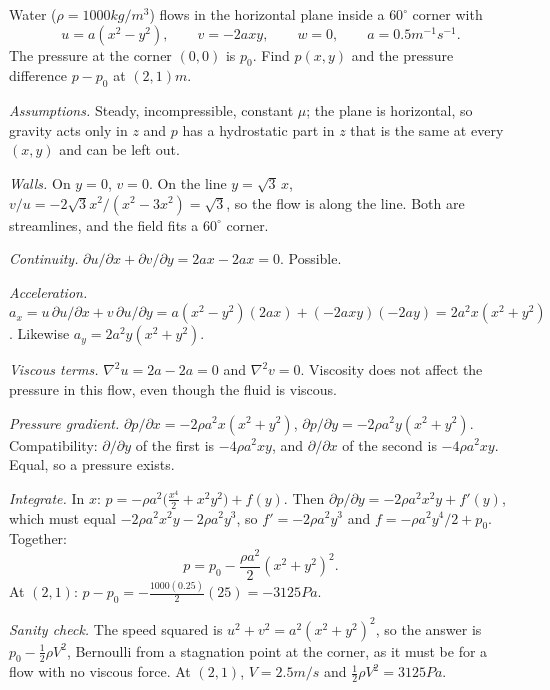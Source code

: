 \begin{example}
Water ($\rho = 1000\unit{kg/m^3}$) flows in the horizontal plane inside a $60^\circ$ corner with
\[
u = a(x^2 - y^2), \qquad v = -2axy, \qquad w = 0, \qquad a = 0.5\unit{m^{-1}s^{-1}} .
\]
The pressure at the corner $(0,0)$ is $p_0$. Find $p(x,y)$ and the pressure difference $p - p_0$ at $(2, 1)\unit{m}$.

\emph{Assumptions.} Steady, incompressible, constant $\mu$; the plane is horizontal, so gravity acts only in $z$ and $p$ has a hydrostatic part in $z$ that is the same at every $(x,y)$ and can be left out.

\emph{Walls.} On $y = 0$, $v = 0$. On the line $y = \sqrt3\,x$, $v/u = -2\sqrt3x^2/(x^2 - 3x^2) = \sqrt3$, so the flow is along the line. Both are streamlines, and the field fits a $60^\circ$ corner.

\emph{Continuity.} $\partial u/\partial x + \partial v/\partial y = 2ax - 2ax = 0$. Possible.

\emph{Acceleration.} $a_x = u\,\partial u/\partial x + v\,\partial u/\partial y = a(x^2 - y^2)(2ax) + (-2axy)(-2ay) = 2a^2x(x^2 + y^2)$. Likewise $a_y = 2a^2y(x^2 + y^2)$.

\emph{Viscous terms.} $\nabla^2 u = 2a - 2a = 0$ and $\nabla^2 v = 0$. Viscosity does not affect the pressure in this flow, even though the fluid is viscous.

\emph{Pressure gradient.} $\partial p/\partial x = -2\rho a^2 x(x^2 + y^2)$, $\partial p/\partial y = -2\rho a^2 y(x^2 + y^2)$. Compatibility: $\partial/\partial y$ of the first is $-4\rho a^2 xy$, and $\partial/\partial x$ of the second is $-4\rho a^2 xy$. Equal, so a pressure exists.

\emph{Integrate.} In $x$: $p = -\rho a^2\big(\tfrac{x^4}{2} + x^2y^2\big) + f(y)$. Then $\partial p/\partial y = -2\rho a^2x^2y + f'(y)$, which must equal $-2\rho a^2 x^2 y - 2\rho a^2 y^3$, so $f' = -2\rho a^2 y^3$ and $f = -\rho a^2 y^4/2 + p_0$. Together:
\[
p = p_0 - \frac{\rho a^2}{2}(x^2 + y^2)^2 .
\]
At $(2,1)$: $p - p_0 = -\tfrac{1000(0.25)}{2}(25) = -3125\unit{Pa}$.

\emph{Sanity check.} The speed squared is $u^2 + v^2 = a^2(x^2 + y^2)^2$, so the answer is $p_0 - \tfrac12\rho V^2$, Bernoulli from a stagnation point at the corner, as it must be for a flow with no viscous force. At $(2,1)$, $V = 2.5\unit{m/s}$ and $\tfrac12\rho V^2 = 3125\unit{Pa}$.
\end{example}

